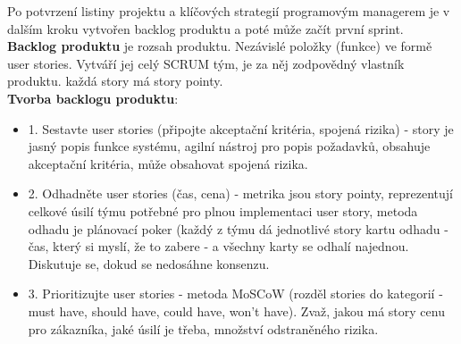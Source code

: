 \documentclass[11pt,a4paper]{article}
\begin{document}
        Po potvrzení listiny projektu a klíčových strategií programovým managerem je v dalším kroku vytvořen backlog produktu a poté může začít první sprint.\\
        \textbf{Backlog produktu} je rozsah produktu. Nezávislé položky (funkce) ve formě user stories. Vytváří jej celý SCRUM tým, je za něj zodpovědný vlastník produktu. každá story má story pointy.\\
        \textbf{Tvorba backlogu produktu}:
        \begin{itemize}
            \item 1. Sestavte user stories (připojte akceptační kritéria, spojená rizika) - story je jasný popis funkce systému, agilní nástroj pro popis požadavků, obsahuje akceptační kritéria, může obsahovat spojená rizika.
            \item 2. Odhadněte user stories (čas, cena) - metrika jsou story pointy, reprezentují celkové úsilí týmu potřebné pro plnou implementaci user story, metoda odhadu je plánovací poker (každý z týmu dá jednotlivé story kartu odhadu - čas, který si myslí, že to zabere - a všechny karty se odhalí najednou. Diskutuje se, dokud se nedosáhne konsenzu.
            \item 3. Prioritizujte user stories - metoda MoSCoW (rozděl stories do kategorií - must have, should have, could have, won't have). Zvaž, jakou má story cenu pro zákazníka, jaké úsilí je třeba, množství odstraněného rizika.
        \end{itemize}
\end{document}
